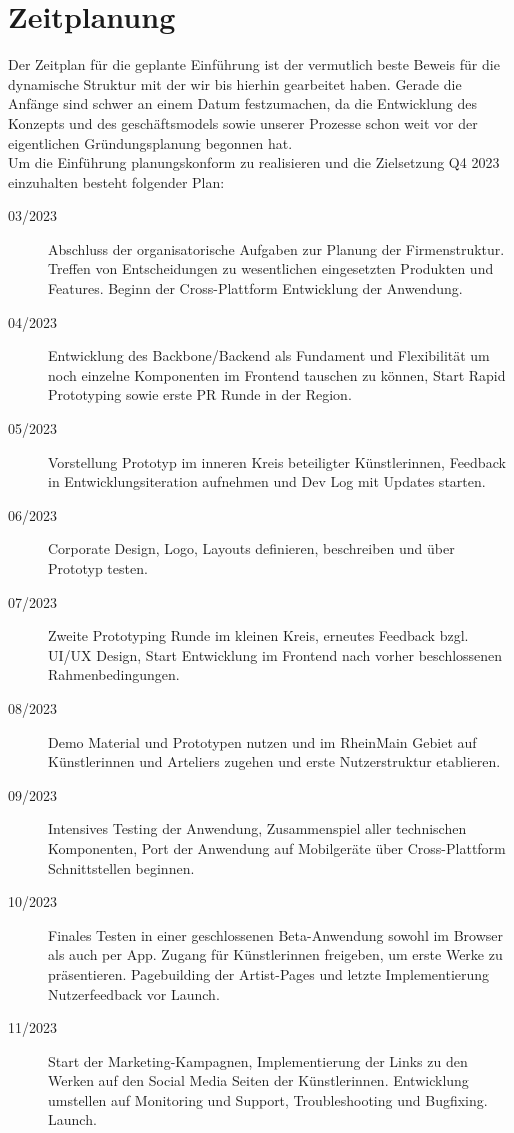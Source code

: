 \documentclass[11pt,a4paper]{report}
\begin{document}
\section{Zeitplanung}
Der Zeitplan für die geplante Einführung ist der vermutlich beste Beweis für die dynamische Struktur mit der wir bis hierhin gearbeitet haben. Gerade die Anfänge sind schwer an einem Datum festzumachen, da die Entwicklung des Konzepts und des geschäftsmodels sowie unserer Prozesse schon weit vor der eigentlichen Gründungsplanung begonnen hat.\\
Um die Einführung planungskonform zu realisieren und die Zielsetzung Q4 2023 einzuhalten besteht folgender Plan:
\begin{description}
\item[03/2023] Abschluss der organisatorische Aufgaben zur Planung der Firmenstruktur. Treffen von Entscheidungen zu wesentlichen eingesetzten Produkten und Features. Beginn der Cross-Plattform Entwicklung der Anwendung.
\item[04/2023] Entwicklung des Backbone/Backend als Fundament und Flexibilität um noch einzelne Komponenten im Frontend tauschen zu können, Start Rapid Prototyping sowie erste PR Runde in der Region.
\item[05/2023] Vorstellung Prototyp im inneren Kreis beteiligter Künstlerinnen, Feedback in Entwicklungsiteration aufnehmen und Dev Log mit Updates starten.
\item[06/2023] Corporate Design, Logo, Layouts definieren, beschreiben und über Prototyp testen.
\item[07/2023] Zweite Prototyping Runde im kleinen Kreis, erneutes Feedback bzgl. UI/UX Design, Start Entwicklung im Frontend nach vorher beschlossenen Rahmenbedingungen.  
\item[08/2023] Demo Material und Prototypen nutzen und im RheinMain Gebiet auf Künstlerinnen und Arteliers zugehen und erste Nutzerstruktur etablieren.
\item[09/2023] Intensives Testing der Anwendung, Zusammenspiel aller technischen Komponenten, Port der Anwendung auf Mobilgeräte über Cross-Plattform Schnittstellen beginnen.
\item[10/2023] Finales Testen in einer geschlossenen Beta-Anwendung sowohl im Browser als auch per App. Zugang für Künstlerinnen freigeben, um erste Werke zu präsentieren. Pagebuilding der Artist-Pages und letzte Implementierung Nutzerfeedback vor Launch.
\item[11/2023] Start der Marketing-Kampagnen, Implementierung der Links zu den Werken auf den Social Media Seiten der Künstlerinnen. Entwicklung umstellen auf Monitoring und Support, Troubleshooting und Bugfixing. Launch.
\end{description}
\end{document}
